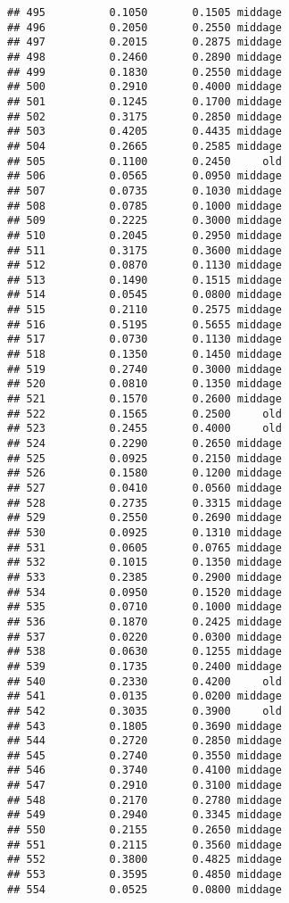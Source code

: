 \documentclass[
]{article}
\begin{document}
\begin{verbatim}
## 495          0.1050       0.1505 middage
## 496          0.2050       0.2550 middage
## 497          0.2015       0.2875 middage
## 498          0.2460       0.2890 middage
## 499          0.1830       0.2550 middage
## 500          0.2910       0.4000 middage
## 501          0.1245       0.1700 middage
## 502          0.3175       0.2850 middage
## 503          0.4205       0.4435 middage
## 504          0.2665       0.2585 middage
## 505          0.1100       0.2450     old
## 506          0.0565       0.0950 middage
## 507          0.0735       0.1030 middage
## 508          0.0785       0.1000 middage
## 509          0.2225       0.3000 middage
## 510          0.2045       0.2950 middage
## 511          0.3175       0.3600 middage
## 512          0.0870       0.1130 middage
## 513          0.1490       0.1515 middage
## 514          0.0545       0.0800 middage
## 515          0.2110       0.2575 middage
## 516          0.5195       0.5655 middage
## 517          0.0730       0.1130 middage
## 518          0.1350       0.1450 middage
## 519          0.2740       0.3000 middage
## 520          0.0810       0.1350 middage
## 521          0.1570       0.2600 middage
## 522          0.1565       0.2500     old
## 523          0.2455       0.4000     old
## 524          0.2290       0.2650 middage
## 525          0.0925       0.2150 middage
## 526          0.1580       0.1200 middage
## 527          0.0410       0.0560 middage
## 528          0.2735       0.3315 middage
## 529          0.2550       0.2690 middage
## 530          0.0925       0.1310 middage
## 531          0.0605       0.0765 middage
## 532          0.1015       0.1350 middage
## 533          0.2385       0.2900 middage
## 534          0.0950       0.1520 middage
## 535          0.0710       0.1000 middage
## 536          0.1870       0.2425 middage
## 537          0.0220       0.0300 middage
## 538          0.0630       0.1255 middage
## 539          0.1735       0.2400 middage
## 540          0.2330       0.4200     old
## 541          0.0135       0.0200 middage
## 542          0.3035       0.3900     old
## 543          0.1805       0.3690 middage
## 544          0.2720       0.2850 middage
## 545          0.2740       0.3550 middage
## 546          0.3740       0.4100 middage
## 547          0.2910       0.3100 middage
## 548          0.2170       0.2780 middage
## 549          0.2940       0.3345 middage
## 550          0.2155       0.2650 middage
## 551          0.2115       0.3560 middage
## 552          0.3800       0.4825 middage
## 553          0.3595       0.4850 middage
## 554          0.0525       0.0800 middage

\end{verbatim}
\end{document}
